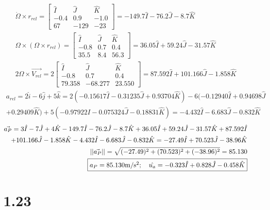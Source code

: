 \documentclass[12 pt]{article}
\begin{document}
\begin{align*}
    \dot{\Omega}\times r_{rel}=\begin{bmatrix}
        \hat{I} & \hat{J} & \hat{K} \\
        -0.4 & 0.9 & -1.0 \\
        67 & -129 & -23
    \end{bmatrix} = -149.7\hat{I} -76.2\hat{J}-8.7\hat{K} \\
    \Omega \times (\Omega \times r_{rel})=\begin{bmatrix}
        \hat{I} & \hat{J} & \hat{K} \\
        -0.8 & 0.7 & 0.4 \\
        35.5 & 8.4 & 56.3
    \end{bmatrix} = 36.05\hat{I} + 59.24\hat{J} -31.57\hat{K} \\
    2\Omega \times \vec{V_{rel}} = 2\begin{bmatrix}
        \hat{I} & \hat{J} & \hat{K} \\
        -0.8 & 0.7 & 0.4 \\
        79.358 & -68.277 & 23.550
    \end{bmatrix} = 87.592\hat{I} + 101.166\hat{J} -1.858\hat{K}
\end{align*}
\begin{align*}
    a_{rel}=2\hat{i}-6\hat{j}+5\hat{k}=2(-0.15617\hat{I}-0.31235\hat{J}+0.93704\hat{K})-6(-0.12940\hat{I}+0.94698\hat{J}\\
    +0.29409\hat{K})+5(-0.97922\hat{I}-0.075324\hat{J}-0.18831\hat{K})=-4.432\hat{I}-6.683\hat{J}-0.832\hat{K}
\end{align*}
\begin{align*}
    \vec{a_P}=3\hat{I}-7\hat{J}+4\hat{K}-149.7\hat{I}-76.2\hat{J}-8.7\hat{K}+36.05\hat{I}+59.24\hat{J}-31.57\hat{K} +87.592\hat{I}
    \\ +101.166\hat{J}-1.858\hat{K}-4.432\hat{I}-6.683\hat{J}-0.832\hat{K} = -27.49\hat{I}+70.523\hat{J}-38.96\hat{K} \\
    ||\vec{a_P}||=\sqrt{(-27.49)^2+(70.523)^2+(-38.96)^2}=85.130 \\
    \fbox{$a_P=85.130\textrm{m/s$^2$}; \quad \hat{u_a}=-0.323\hat{I}+0.828\hat{J}-0.458\hat{K}$}
\end{align*}
\vspace{5.5in}
\section*{1.23}
\end{document}

